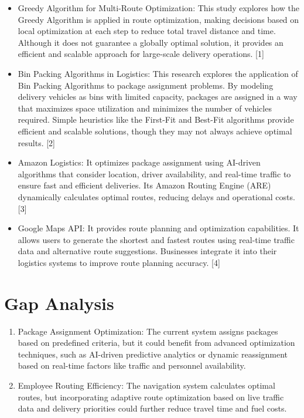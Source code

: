 \begin{itemize}
    \item Greedy Algorithm for Multi-Route Optimization: This study explores how the Greedy Algorithm is applied in route optimization, making decisions based on local optimization at each step to reduce total travel distance and time. Although it does not guarantee a globally optimal solution, it provides an efficient and scalable approach for large-scale delivery operations. [1]
    \item Bin Packing Algorithms in Logistics: This research explores the application of Bin Packing Algorithms to package assignment problems. By modeling delivery vehicles as bins with limited capacity, packages are assigned in a way that maximizes space utilization and minimizes the number of vehicles required. Simple heuristics like the First-Fit and Best-Fit algorithms provide efficient and scalable solutions, though they may not always achieve optimal results. [2]
    \item Amazon Logistics: 
    It optimizes package assignment using AI-driven algorithms that consider location, driver availability, and real-time traffic to ensure fast and efficient deliveries. Its Amazon Routing Engine (ARE) dynamically calculates optimal routes, reducing delays and operational costs. [3]
    \item Google Maps API: 
    It provides route planning and optimization capabilities. It allows users to generate the shortest and fastest routes using real-time traffic data and alternative route suggestions. Businesses integrate it into their logistics systems to improve route planning accuracy. [4]
\end{itemize}
\section{Gap Analysis}
\begin{enumerate}
    \item Package Assignment Optimization: The current system assigns packages based on predefined criteria, but it could benefit from advanced optimization techniques, such as AI-driven predictive analytics or dynamic reassignment based on real-time factors like traffic and personnel availability.
    \item Employee Routing Efficiency: The navigation system calculates optimal routes, but incorporating adaptive route optimization based on live traffic data and delivery priorities could further reduce travel time and fuel costs.
\end{enumerate}
